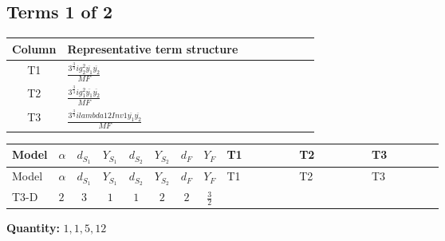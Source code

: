 \documentclass[8pt]{article}
\begin{document}
\begin{landscape}
\subsection*{Terms 1 of 2}
\begin{center}
\begin{tabular}{@{}c >{\raggedright\arraybackslash}p{0.82\linewidth}@{}}
\toprule
Column & Representative term structure \\
\midrule
T1 & \(\displaystyle \frac{3^{\frac{3}{4}} i g_{2}^{2} \overline{y_{1}} \overline{y_{2}}}{MF}\) \\
\midrule
T2 & \(\displaystyle \frac{3^{\frac{3}{4}} i g_{1}^{2} \overline{y_{1}} \overline{y_{2}}}{MF}\) \\
\midrule
T3 & \(\displaystyle \frac{3^{\frac{3}{4}} i lambda12Inv1 \overline{y_{1}} \overline{y_{2}}}{MF}\) \\
\midrule
\bottomrule
\end{tabular}
\end{center}
\smallskip
\tiny
\begin{longtable}{@{}llcccccc >{\raggedright\arraybackslash}p{0.21\linewidth} >{\raggedright\arraybackslash}p{0.21\linewidth} >{\raggedright\arraybackslash}p{0.21\linewidth}@{}}
\toprule
Model & $\alpha$ & $d_{S_1}$ & $Y_{S_1}$ & $d_{S_2}$ & $Y_{S_2}$ & $d_F$ & $Y_F$ & T1 & T2 & T3 \\
\midrule
\endfirsthead
\toprule
Model & $\alpha$ & $d_{S_1}$ & $Y_{S_1}$ & $d_{S_2}$ & $Y_{S_2}$ & $d_F$ & $Y_F$ & T1 & T2 & T3 \\
\midrule
\endhead
T3-D & $2$ & $3$ & $1$ & $1$ & $2$ & $2$ & $\frac{3}{2}$ & \scriptsize\adjustbox{max width=\linewidth}{$\begin{gathered} - \frac{17 \cdot 3^{\frac{3}{4}} i g_{2}^{2} \overline{y_{1}} \overline{y_{2}}}{24 MF}\end{gathered}$} & \scriptsize\adjustbox{max width=\linewidth}{$\begin{gathered} - \frac{9 \cdot 3^{\frac{3}{4}} i g_{1}^{2} \overline{y_{1}} \overline{y_{2}}}{8 MF}\end{gathered}$} & \scriptsize\adjustbox{max width=\linewidth}{$\begin{gathered} - \frac{3^{\frac{3}{4}} i lambda12Inv1 \overline{y_{1}} \overline{y_{2}}}{6 MF}\end{gathered}$} \\
\midrule
\bottomrule
\end{longtable}
\clearpage
\noindent\textbf{Quantity: }$\mathrm{1,1,5,12}$\par\smallskip

\end{landscape}
\end{document}
